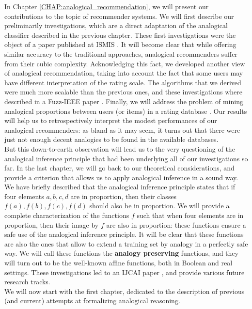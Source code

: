 In Chapter \ref{CHAP:analogical_recommendation}, we will present our
contributions to the topic of recommender systems. We will first describe our
preliminarily investigations, which are a direct adaptation of the analogical
classifier described in the previous chapter. These first investigations were
the object of a paper published at ISMIS \cite{HugPraRicISMIS15}. It will
become clear that while offering similar accuracy to the traditional
approaches, analogical recommenders suffer from their cubic complexity.
Acknowledging this fact, we developed another view of analogical
recommendation, taking into account the fact that some users may have different
interpretation of the rating scale. The algorithms that we derived were much
more scalable than the previous ones, and these investigations where described
in a Fuzz-IEEE paper \cite{HugPraRicSerFuzzIEEE16}.  Finally, we will address
the problem of mining analogical proportions between users (or items) in a
rating database \cite{HugPraRicSerLFA16}. Our results will help us to
retrospectively interpret the modest performances of our analogical
recommenders: as bland as it may seem, it turns out that there were just not
enough decent analogies to be found in the available databases.\\

But this down-to-earth observation will lead us to the very questioning of
the analogical inference principle that had been underlying all of our
investigations so far. In the last chapter, we will go back to our theoretical
considerations, and provide a criterion that allows us to apply analogical
inference in a sound way. We have briefly described that the analogical
inference principle states that if four elements $a, b, c, d$ are in
proportion, then their classes $f(a), f(b), f(c), f(d)$ should also be in
proportion. We will provide a complete characterization of the functions $f$
such that when four elements are in proportion, then their image by $f$ are
also in proportion: these functions ensure a safe use of the analogical
inference principle. It will be clear that these functions are also the ones
that allow to extend a training set by analogy in a perfectly safe way. We will
call these functions the \textbf{analogy preserving} functions, and they will
turn out to be the well-known affine functions, both in Boolean and real
settings. These investigations led to an IJCAI paper
\cite{CouHugPraRicIJCAI17}, and provide various future research tracks.\\


We will now start with the first chapter, dedicated to the description of
previous (and current) attempts at formalizing analogical reasoning.
